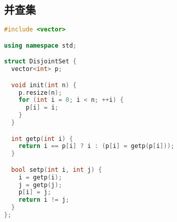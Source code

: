 \subsection{并查集}
\begin{lstlisting}[language=C++]
#include <vector>

using namespace std;

struct DisjointSet {
  vector<int> p;

  void init(int n) {
    p.resize(n);
    for (int i = 0; i < n; ++i) {
      p[i] = i;
    }
  }

  int getp(int i) {
    return i == p[i] ? i : (p[i] = getp(p[i]));
  }

  bool setp(int i, int j) {
    i = getp(i);
    j = getp(j);
    p[i] = j;
    return i != j;
  }
};

\end{lstlisting}
